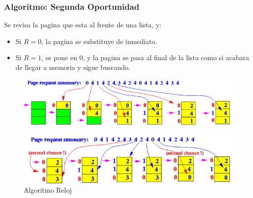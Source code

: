 \documentclass{beamer}
\newcommand{\algTitle}{\textbf{Algoritmo:} }
\begin{document}
\begin{frame}
	\frametitle{\algTitle Segunda Oportunidad}
	\footnotesize	
	Se revisa la pagina que esta al frente de una lista, y:
	\begin{itemize}
		\footnotesize
		\item Si $R = 0$, la pagina se substituye de inmediato.
		\item Si $R = 1$, se pone en 0, y la pagina se pasa al final de la lista como si acabara de llegar a memoria y sigue buscando.
	\end{itemize}
	
	\begin{figure}[H]
		\centering
		\includegraphics[scale=0.45]{img/sop1.png}
	\end{figure}
	\begin{figure}[H]
		\centering
		\includegraphics[scale=0.45]{img/sop2.png}
		\caption{Algoritmo Reloj}
	\end{figure}
\end{frame}
\end{document}
